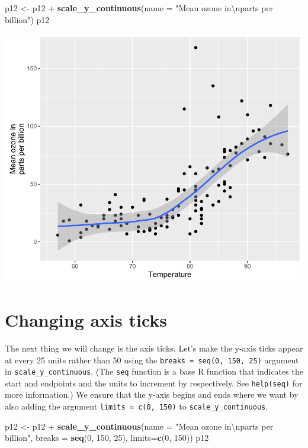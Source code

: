 \documentclass[]{article}
\newenvironment{Shaded}{\begin{snugshade}}{\end{snugshade}}
\newcommand{\KeywordTok}[1]{\textcolor[rgb]{0.13,0.29,0.53}{\textbf{{#1}}}}
\newcommand{\DataTypeTok}[1]{\textcolor[rgb]{0.13,0.29,0.53}{{#1}}}
\newcommand{\DecValTok}[1]{\textcolor[rgb]{0.00,0.00,0.81}{{#1}}}
\newcommand{\CharTok}[1]{\textcolor[rgb]{0.31,0.60,0.02}{{#1}}}
\newcommand{\StringTok}[1]{\textcolor[rgb]{0.31,0.60,0.02}{{#1}}}
\newcommand{\NormalTok}[1]{{#1}}
\begin{document}
\begin{Shaded}
\begin{Highlighting}[]
\NormalTok{p12 <-}\StringTok{ }\NormalTok{p12 +}\StringTok{ }\KeywordTok{scale_y_continuous}\NormalTok{(}\DataTypeTok{name =} \StringTok{"Mean ozone in}\CharTok{\textbackslash{}n}\StringTok{parts per billion"}\NormalTok{)}
\NormalTok{p12}
\end{Highlighting}
\end{Shaded}

\begin{center}\includegraphics{12_Lowess_Plots_pdf/lowess_6-1} \end{center}

\section{Changing axis ticks}\label{changing-axis-ticks}

The next thing we will change is the axis ticks. Let's make the y-axis
ticks appear at every 25 units rather than 50 using the
\texttt{breaks\ =\ seq(0,\ 150,\ 25)} argument in
\texttt{scale\_y\_continuous}. (The \texttt{seq} function is a base R
function that indicates the start and endpoints and the units to
increment by respectively. See \texttt{help(seq)} for more information.)
We ensure that the y-axis begins and ends where we want by also adding
the argument \texttt{limits\ =\ c(0,\ 150)} to
\texttt{scale\_y\_continuous}.

\begin{Shaded}
\begin{Highlighting}[]
\NormalTok{p12 <-}\StringTok{ }\NormalTok{p12 +}\StringTok{ }\KeywordTok{scale_y_continuous}\NormalTok{(}\DataTypeTok{name =} \StringTok{"Mean ozone in}\CharTok{\textbackslash{}n}\StringTok{parts per billion"}\NormalTok{,}
                                \DataTypeTok{breaks =} \KeywordTok{seq}\NormalTok{(}\DecValTok{0}\NormalTok{, }\DecValTok{150}\NormalTok{, }\DecValTok{25}\NormalTok{), }\DataTypeTok{limits=}\KeywordTok{c}\NormalTok{(}\DecValTok{0}\NormalTok{, }\DecValTok{150}\NormalTok{))}
\NormalTok{p12}
\end{Highlighting}
\end{Shaded}
\end{document}
